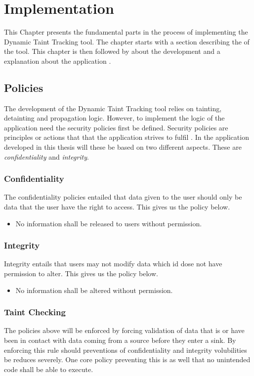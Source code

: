 \chapter{Implementation}
This Chapter presents the fundamental parts in the process of implementing the Dynamic Taint Tracking tool. The chapter starts with a section describing the \textit{} of the tool. This chapter is then followed by \textit{} about the development and a explanation about the application \textit{}.


\section{Policies}
\label{Policies}
The development of the Dynamic Taint Tracking tool relies on tainting, detainting and propagation logic. However, to implement the logic of the application need the security policies first be defined. Security policies are principles or actions that that the application strives to fulfil \parencite{BayukJenniferL2012Cspg}. In the application developed in this thesis will these be based on two different aspects. These are \textit{confidentiality} and \textit{integrity}.


\subsection{Confidentiality}
The confidentiality policies entailed that data given to the user should only be data that the user have the right to access. This gives us the policy below.

\hfill
\begin{itemize}  
  \item No information shall be released to users without permission.
\end{itemize}
\hfill


\subsection{Integrity}
Integrity entails that users may not modify data which id dose not have permission to alter. This gives us the policy below.

\hfill
\begin{itemize}  
  \item No information shall be altered without permission.
\end{itemize}
\hfill


\subsection{Taint Checking}
The policies above will be enforced by forcing validation of data that is or have been in contact with data coming from a source before they enter a sink. By enforcing this rule should preventions of confidentiality and integrity volubilities be reduces severely. One core policy preventing this is as well that no unintended code shall be able to execute.

